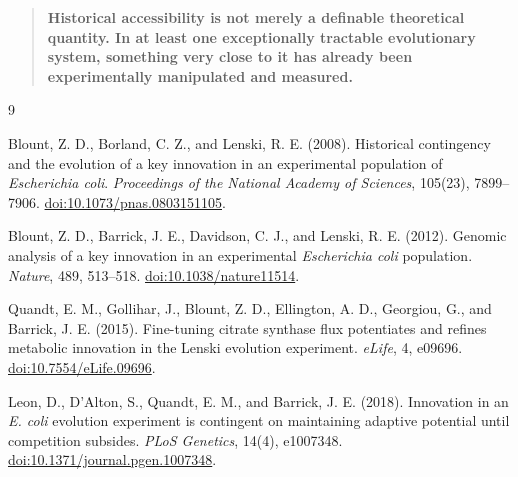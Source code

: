 \documentclass[11pt]{article}
\begin{document}
\begin{quote}
\textbf{Historical accessibility is not merely a definable theoretical quantity. In at least one exceptionally tractable evolutionary system, something very close to it has already been experimentally manipulated and measured.}
\end{quote}

\begin{thebibliography}{9}

Blount, Z. D., Borland, C. Z., and Lenski, R. E. (2008).
Historical contingency and the evolution of a key innovation in an experimental population of \emph{Escherichia coli}.
\emph{Proceedings of the National Academy of Sciences}, 105(23), 7899--7906.
\href{https://doi.org/10.1073/pnas.0803151105}{doi:10.1073/pnas.0803151105}.

Blount, Z. D., Barrick, J. E., Davidson, C. J., and Lenski, R. E. (2012).
Genomic analysis of a key innovation in an experimental \emph{Escherichia coli} population.
\emph{Nature}, 489, 513--518.
\href{https://doi.org/10.1038/nature11514}{doi:10.1038/nature11514}.

Quandt, E. M., Gollihar, J., Blount, Z. D., Ellington, A. D., Georgiou, G., and Barrick, J. E. (2015).
Fine-tuning citrate synthase flux potentiates and refines metabolic innovation in the Lenski evolution experiment.
\emph{eLife}, 4, e09696.
\href{https://doi.org/10.7554/eLife.09696}{doi:10.7554/eLife.09696}.

Leon, D., D'Alton, S., Quandt, E. M., and Barrick, J. E. (2018).
Innovation in an \emph{E. coli} evolution experiment is contingent on maintaining adaptive potential until competition subsides.
\emph{PLoS Genetics}, 14(4), e1007348.
\href{https://doi.org/10.1371/journal.pgen.1007348}{doi:10.1371/journal.pgen.1007348}.

\end{thebibliography}
\end{document}
